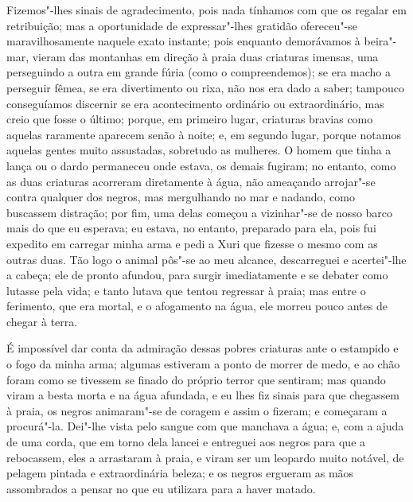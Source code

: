 Fizemos"-lhes sinais de agradecimento, pois nada tínhamos com que os
regalar em retribuição; mas a oportunidade de expressar"-lhes gratidão
ofereceu"-se maravilhosamente naquele exato instante; pois enquanto
demorávamos à beira"-mar, vieram das montanhas em direção à praia duas
criaturas imensas, uma perseguindo a outra em grande fúria (como o
compreendemos); se era macho a perseguir fêmea, se era divertimento ou
rixa, não nos era dado a saber; tampouco conseguíamos discernir se era
acontecimento ordinário ou extraordinário, mas creio que fosse o último;
porque, em primeiro lugar, criaturas bravias como aquelas raramente
aparecem senão à noite; e, em segundo lugar, porque notamos aquelas
gentes muito assustadas, sobretudo as mulheres. O homem que tinha a
lança ou o dardo permaneceu onde estava, os demais fugiram; no entanto,
como as duas criaturas acorreram diretamente à água, não ameaçando
arrojar"-se contra qualquer dos negros, mas mergulhando no mar e nadando,
como buscassem distração; por fim, uma delas começou a vizinhar"-se de
nosso barco mais do que eu esperava; eu estava, no entanto, preparado
para ela, pois fui expedito em carregar minha arma e pedi a Xuri que
fizesse o mesmo com as outras duas. Tão logo o animal pôs"-se ao meu
alcance, descarreguei e acertei"-lhe a cabeça; ele de pronto afundou,
para surgir imediatamente e se debater como lutasse pela vida; e tanto
lutava que tentou regressar à praia; mas entre o ferimento, que era
mortal, e o afogamento na água, ele morreu pouco antes de chegar à
terra.

É impossível dar conta da admiração dessas pobres criaturas ante o
estampido e o fogo da minha arma; algumas estiveram a ponto de morrer de
medo, e ao chão foram como se tivessem se finado do próprio terror que
sentiram; mas quando viram a besta morta e na água afundada, e eu lhes
fiz sinais para que chegassem à praia, os negros animaram"-se de coragem
e assim o fizeram; e começaram a procurá"-la. Dei"-lhe vista pelo sangue
com que manchava a água; e, com a ajuda de uma corda, que em torno dela
lancei e entreguei aos negros para que a rebocassem, eles a arrastaram à
praia, e viram ser um leopardo muito notável, de pelagem pintada e
extraordinária beleza; e os negros ergueram as mãos assombrados a pensar
no que eu utilizara para a haver matado.

